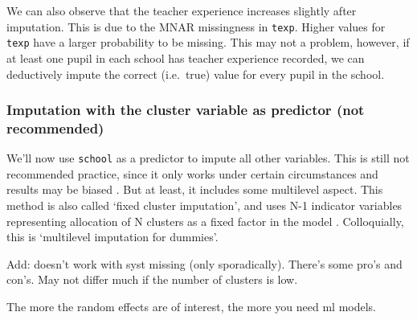 \documentclass[
]{jss}
\begin{document}
We can also observe that the teacher experience increases slightly after
imputation. This is due to the MNAR missingness in \texttt{texp}. Higher
values for \texttt{texp} have a larger probability to be missing. This
may not a problem, however, if at least one pupil in each school has
teacher experience recorded, we can deductively impute the correct
(i.e.~true) value for every pupil in the school.

\hypertarget{imputation-with-the-cluster-variable-as-predictor-not-recommended}{%
\subsubsection{Imputation with the cluster variable as predictor (not
recommended)}\label{imputation-with-the-cluster-variable-as-predictor-not-recommended}}

We'll now use \texttt{school} as a predictor to impute all other
variables. This is still not recommended practice, since it only works
under certain circumstances and results may be biased
\citep{drec15, ende16}. But at least, it includes some multilevel
aspect. This method is also called `fixed cluster imputation', and uses
N-1 indicator variables representing allocation of N clusters as a fixed
factor in the model \citep{reit06, ende16}. Colloquially, this is
`multilevel imputation for dummies'.

Add: doesn't work with syst missing (only sporadically). There's some
pro's and con's. May not differ much if the number of clusters is low.

The more the random effects are of interest, the more you need ml
models.

\begin{CodeChunk}
\end{CodeChunk}
\end{document}
